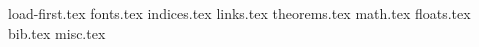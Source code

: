 
{load-first.tex}
{fonts.tex}
{indices.tex}
{links.tex}
{theorems.tex}
{math.tex}
{floats.tex}
{bib.tex}
{misc.tex}
